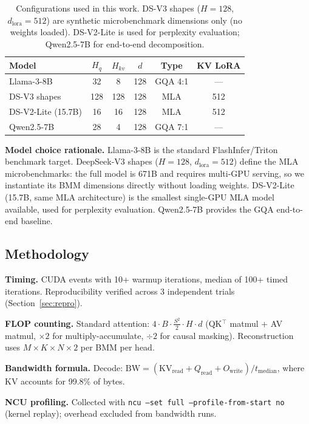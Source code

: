 \documentclass[10pt,twocolumn]{article}
\begin{document}
\begin{table}[h]
\centering
\small
\caption{Configurations used in this work.  DS-V3 shapes ($H{=}128$, $d_\text{lora}{=}512$) are synthetic microbenchmark dimensions only (no weights loaded).  DS-V2-Lite is used for perplexity evaluation; Qwen2.5-7B for end-to-end decomposition.}
\label{tab:configs}
\begin{tabular}{@{}lccccc@{}}
\toprule
Model & $H_q$ & $H_{kv}$ & $d$ & Type & KV LoRA \\
\midrule
Llama-3-8B        & 32  & 8   & 128 & GQA 4:1 & ---  \\
DS-V3 shapes      & 128 & 128 & 128 & MLA     & 512  \\
DS-V2-Lite (15.7B) & 16 & 16  & 128 & MLA     & 512  \\
Qwen2.5-7B        & 28  & 4   & 128 & GQA 7:1 & ---  \\
\bottomrule
\end{tabular}
\end{table}

\textbf{Model choice rationale.}  Llama-3-8B is the standard FlashInfer/Triton benchmark target.  DeepSeek-V3 shapes ($H{=}128$, $d_\text{lora}{=}512$) define the MLA microbenchmarks: the full model is 671B and requires multi-GPU serving, so we instantiate its BMM dimensions directly without loading weights.  DS-V2-Lite (15.7B, same MLA architecture) is the smallest single-GPU MLA model available, used for perplexity evaluation.  Qwen2.5-7B provides the GQA end-to-end baseline.

\subsection{Methodology}

\textbf{Timing.}  CUDA events with 10+ warmup iterations, median of 100+ timed iterations.  Reproducibility verified across 3 independent trials (Section~\ref{sec:repro}).

\textbf{FLOP counting.}  Standard attention: $4 \cdot B \cdot \frac{S^2}{2} \cdot H \cdot d$ (QK$^\top$ matmul + AV matmul, $\times 2$ for multiply-accumulate, $\div 2$ for causal masking).  Reconstruction uses $M \times K \times N \times 2$ per BMM per head.

\textbf{Bandwidth formula.}  Decode: $\text{BW} = (\text{KV}_\text{read} + Q_\text{read} + O_\text{write}) / t_\text{median}$, where KV accounts for 99.8\% of bytes.

\textbf{NCU profiling.}  Collected with \texttt{ncu --set full --profile-from-start no} (kernel replay); overhead excluded from bandwidth runs.
\end{document}
